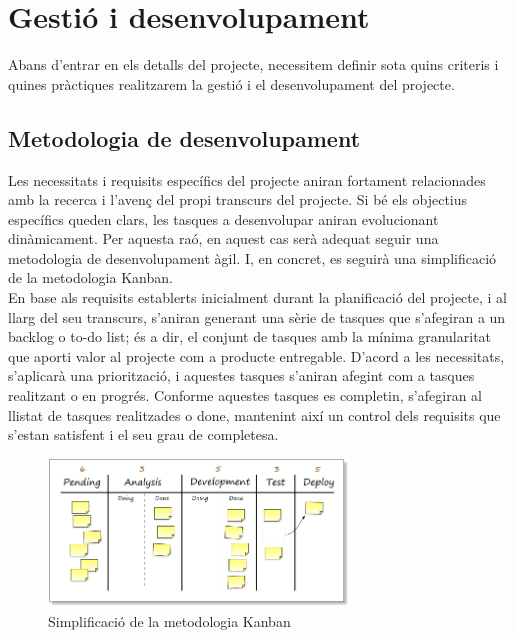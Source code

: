 
\chapter{Gestió i desenvolupament} %

\label{GestioIDesenvolupament} %

Abans d'entrar en els detalls del projecte, necessitem definir sota quins criteris i quines pràctiques realitzarem la gestió i el desenvolupament del projecte.


\section{Metodologia de desenvolupament}

Les necessitats i requisits específics del projecte aniran fortament relacionades amb la recerca i l’avenç del propi transcurs del projecte. Si bé els objectius específics queden clars, les tasques a desenvolupar aniran evolucionant dinàmicament. Per aquesta raó, en aquest cas serà adequat seguir una metodologia de desenvolupament àgil. I, en concret, es seguirà una simplificació de la metodologia Kanban. \\

En base als requisits establerts inicialment durant la planificació del projecte, i al llarg del seu transcurs, s’aniran generant una sèrie de tasques que s’afegiran a un backlog o to-do list; és a dir, el conjunt de tasques amb la mínima granularitat que aporti valor al projecte com a producte entregable. D’acord a les necessitats, s’aplicarà una priorització, i aquestes tasques s’aniran afegint com a tasques realitzant o en progrés. Conforme aquestes tasques es completin, s’afegiran al llistat de tasques realitzades o done, mantenint així un control dels requisits que s’estan satisfent i el seu grau de completesa. \\

\begin{figure}
\centering
\includegraphics[width=8cm]{Figures/Figure3}
\decoRule
\caption[Simplificació de la metodologia Kanban]{Simplificació de la metodologia Kanban}
\label{fig:Figura3}
\end{figure}

